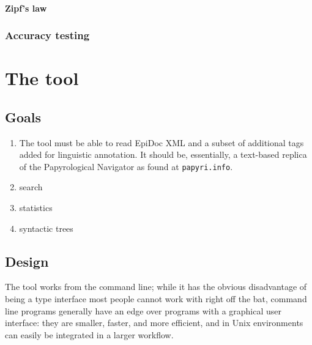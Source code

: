 \documentclass[10pt,a4paper,twoside,openright,titlepage,fleqn,%
               headinclude,,footinclude,BCOR5mm,%
               numbers=noenddot,cleardoublepage=empty,%
               tablecaptionabove]{scrbook}
\begin{document}

\subsubsection{Zipf's law} %
\label{ssub:zipflaw}


\subsection{Accuracy testing} %
\label{sub:accuracy-testing}


\chapter{The tool}
\label{chp:design}
\minitoc\mtcskip
\section{Goals} %
\label{sec:tool-goals}


\begin{enumerate} 
  \item The tool must be able to read EpiDoc XML and a subset of
      additional tags added for linguistic annotation. It should be,
      essentially, a text-based replica of the Papyrological Navigator as found
      at \texttt{papyri.info}. 
    \item search 
    \item statistics
    \item syntactic trees
\end{enumerate}

\section{Design} %
\label{sec:tool-design} 
The tool works from the command line; while it has the obvious disadvantage of
being a type interface most people cannot work with right off the bat, command
line programs generally have an edge over programs with a graphical user
interface: they are smaller, faster, and more efficient, and in Unix
environments can easily be integrated in a larger workflow.
\end{document}
